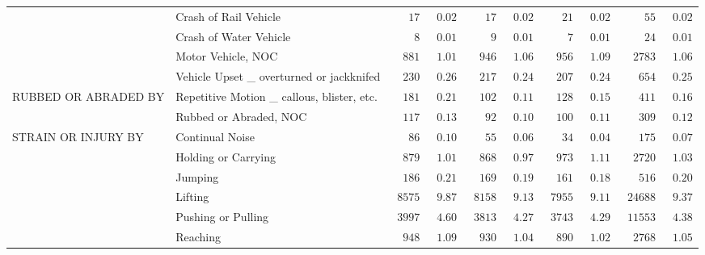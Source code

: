\documentclass[9pt, oneside]{article}   	%
\begin{document}
\begin{longtable}{p{1.8in}p{2.2in}cccccccc}
 & Crash of Rail Vehicle  & $\phantom{000}17$ & $\phantom{0}0.02$ & $\phantom{000}17$ & $\phantom{0}0.02$ & $\phantom{000}21$ & $\phantom{0}0.02$ & $\phantom{0000}55$ & $\phantom{0}0.02$ \\
 & Crash of Water Vehicle  & $\phantom{0000}8$ & $\phantom{0}0.01$ & $\phantom{0000}9$ & $\phantom{0}0.01$ & $\phantom{0000}7$ & $\phantom{0}0.01$ & $\phantom{0000}24$ & $\phantom{0}0.01$ \\
 & Motor Vehicle, NOC  & $\phantom{00}881$ & $\phantom{0}1.01$ & $\phantom{00}946$ & $\phantom{0}1.06$ & $\phantom{00}956$ & $\phantom{0}1.09$ & $\phantom{00}2783$ & $\phantom{0}1.06$ \\
 & Vehicle Upset \_ overturned or jackknifed  & $\phantom{00}230$ & $\phantom{0}0.26$ & $\phantom{00}217$ & $\phantom{0}0.24$ & $\phantom{00}207$ & $\phantom{0}0.24$ & $\phantom{000}654$ & $\phantom{0}0.25$ \\
RUBBED OR ABRADED BY & Repetitive Motion \_ callous, blister, etc.  & $\phantom{00}181$ & $\phantom{0}0.21$ & $\phantom{00}102$ & $\phantom{0}0.11$ & $\phantom{00}128$ & $\phantom{0}0.15$ & $\phantom{000}411$ & $\phantom{0}0.16$ \\
 & Rubbed or Abraded, NOC  & $\phantom{00}117$ & $\phantom{0}0.13$ & $\phantom{000}92$ & $\phantom{0}0.10$ & $\phantom{00}100$ & $\phantom{0}0.11$ & $\phantom{000}309$ & $\phantom{0}0.12$ \\
STRAIN OR INJURY BY & Continual Noise  & $\phantom{000}86$ & $\phantom{0}0.10$ & $\phantom{000}55$ & $\phantom{0}0.06$ & $\phantom{000}34$ & $\phantom{0}0.04$ & $\phantom{000}175$ & $\phantom{0}0.07$ \\
 & Holding or Carrying  & $\phantom{00}879$ & $\phantom{0}1.01$ & $\phantom{00}868$ & $\phantom{0}0.97$ & $\phantom{00}973$ & $\phantom{0}1.11$ & $\phantom{00}2720$ & $\phantom{0}1.03$ \\
 & Jumping  & $\phantom{00}186$ & $\phantom{0}0.21$ & $\phantom{00}169$ & $\phantom{0}0.19$ & $\phantom{00}161$ & $\phantom{0}0.18$ & $\phantom{000}516$ & $\phantom{0}0.20$ \\
 & Lifting  & $\phantom{0}8575$ & $\phantom{0}9.87$ & $\phantom{0}8158$ & $\phantom{0}9.13$ & $\phantom{0}7955$ & $\phantom{0}9.11$ & $\phantom{0}24688$ & $\phantom{0}9.37$ \\
 & Pushing or Pulling  & $\phantom{0}3997$ & $\phantom{0}4.60$ & $\phantom{0}3813$ & $\phantom{0}4.27$ & $\phantom{0}3743$ & $\phantom{0}4.29$ & $\phantom{0}11553$ & $\phantom{0}4.38$ \\
 & Reaching  & $\phantom{00}948$ & $\phantom{0}1.09$ & $\phantom{00}930$ & $\phantom{0}1.04$ & $\phantom{00}890$ & $\phantom{0}1.02$ & $\phantom{00}2768$ & $\phantom{0}1.05$ \\

\end{longtable}
\end{document}
